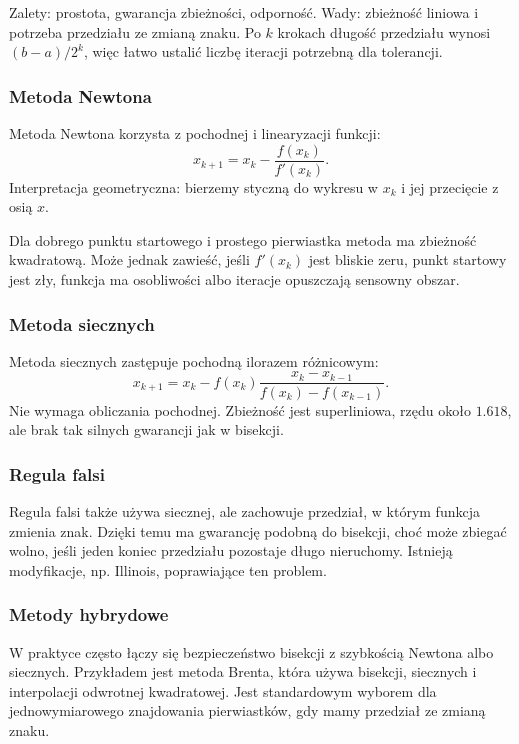 Zalety: prostota, gwarancja zbieżności, odporność. Wady: zbieżność liniowa i potrzeba przedziału ze zmianą znaku. Po $k$ krokach długość przedziału wynosi $(b-a)/2^k$, więc łatwo ustalić liczbę iteracji potrzebną dla tolerancji.

\subsubsection{Metoda Newtona}

Metoda Newtona korzysta z pochodnej i linearyzacji funkcji:
\[
x_{k+1}=x_k-\frac{f(x_k)}{f'(x_k)}.
\]
Interpretacja geometryczna: bierzemy styczną do wykresu w $x_k$ i jej przecięcie z osią $x$.

Dla dobrego punktu startowego i prostego pierwiastka metoda ma zbieżność kwadratową. Może jednak zawieść, jeśli $f'(x_k)$ jest bliskie zeru, punkt startowy jest zły, funkcja ma osobliwości albo iteracje opuszczają sensowny obszar.

\subsubsection{Metoda siecznych}

Metoda siecznych zastępuje pochodną ilorazem różnicowym:
\[
x_{k+1}=x_k-f(x_k)\frac{x_k-x_{k-1}}{f(x_k)-f(x_{k-1})}.
\]
Nie wymaga obliczania pochodnej. Zbieżność jest superliniowa, rzędu około $1.618$, ale brak tak silnych gwarancji jak w bisekcji.

\subsubsection{Regula falsi}

Regula falsi także używa siecznej, ale zachowuje przedział, w którym funkcja zmienia znak. Dzięki temu ma gwarancję podobną do bisekcji, choć może zbiegać wolno, jeśli jeden koniec przedziału pozostaje długo nieruchomy. Istnieją modyfikacje, np. Illinois, poprawiające ten problem.

\subsubsection{Metody hybrydowe}

W praktyce często łączy się bezpieczeństwo bisekcji z szybkością Newtona albo siecznych. Przykładem jest metoda Brenta, która używa bisekcji, siecznych i interpolacji odwrotnej kwadratowej. Jest standardowym wyborem dla jednowymiarowego znajdowania pierwiastków, gdy mamy przedział ze zmianą znaku.

